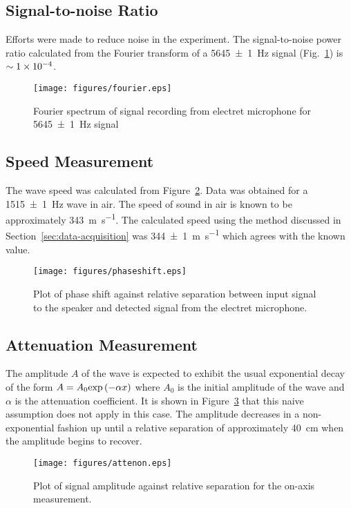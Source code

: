 \documentclass[twocolumn]{article}
\begin{document}
\subsection{Signal-to-noise Ratio}
Efforts were made to reduce noise in the experiment. The signal-to-noise power ratio calculated from the Fourier transform of a \SI{5645+-1}{\hertz} signal (Fig.~\ref{fig:fourier}) is $\sim\num{1d-4}$.
\begin{figure}
    \centering
    \texttt{[image: figures/fourier.eps]}
    \caption{Fourier spectrum of signal recording from electret microphone for \SI{5645+-1}{\hertz} signal}
    \label{fig:fourier}
\end{figure}

\subsection{Speed Measurement}
The wave speed was calculated from Figure~\ref{fig:phaseshift}. Data was obtained for a \SI{1515+-1}{\hertz} wave in air. The speed of sound in air is known to be approximately \SI{343}{\m\per\second}. The calculated speed using the method discussed in Section~\ref{sec:data-acquisition} was \SI{344+-1}{\m\per\second} which agrees with the known value.
\begin{figure}
    \centering
    \texttt{[image: figures/phaseshift.eps]}
    \caption{Plot of phase shift against relative separation between input signal to the speaker and detected signal from the electret microphone.}
    \label{fig:phaseshift}
\end{figure}

\subsection{Attenuation Measurement}
The amplitude $A$ of the wave is expected to exhibit the usual exponential decay of the form $A = A_0\textrm{exp\,}(-\alpha{x})$ where $A_0$ is the initial amplitude of the wave and $\alpha$ is the attenuation coefficient. It is shown in Figure~\ref{fig:attenon} that this naive assumption does not apply in this case. The amplitude decreases in a non-exponential fashion up until a relative separation of approximately \SI{40}{\cm} when the amplitude begins to recover.
\begin{figure}
    \centering
    \texttt{[image: figures/attenon.eps]}
    \caption{Plot of signal amplitude against relative separation for the on-axis measurement.}
    \label{fig:attenon}
\end{figure}
\end{document}

